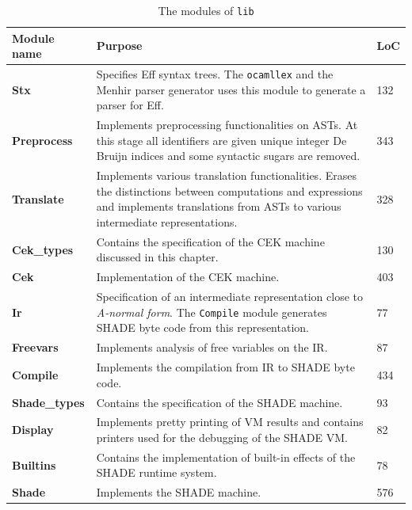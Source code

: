\documentclass[class=article, crop=false]{standalone}
\begin{document}
\begin{table}
    \centering
    {\renewcommand{\arraystretch}{1.3}
    \begin{tabular}{p{3cm}p{10cm}l}
    \toprule
    \textbf{Module name} & \textbf{Purpose} & \textbf{LoC} \\
    \midrule
    \textbf{Stx} & 
        Specifies Eff syntax trees. The \verb|ocamllex| and the Menhir parser
        generator uses this module to generate a parser for Eff. &
        132 \\
    \textbf{Preprocess} &
        Implements preprocessing functionalities on ASTs. At this stage all
        identifiers are given unique integer De Bruijn indices
        and some syntactic sugars are removed.  &
        343 \\
    \textbf{Translate} &
        Implements various translation functionalities. Erases the distinctions
        between computations and expressions and implements translations from
        ASTs to various intermediate representations. &
        328 \\
    \textbf{Cek\_types} & Contains the specification of the CEK machine
        discussed in this chapter. &
        130 \\
    \textbf{Cek} &
        Implementation of the CEK machine. &
        403 \\
    \textbf{Ir} &
        Specification of an intermediate representation close to \emph{A-normal
        form}. The \verb|Compile| module generates SHADE byte code from this
        representation. &
        77 \\
    \textbf{Freevars} &
        Implements analysis of free variables on the IR. &
        87 \\
    \textbf{Compile} &
        Implements the compilation from IR to SHADE byte code. &
        434 \\
    \textbf{Shade\_types} &
        Contains the specification of the SHADE machine. &
        93 \\
    \textbf{Display} &
        Implements pretty printing of VM results and contains printers used for
        the debugging of the SHADE VM. &
        82 \\
    \textbf{Builtins} &
        Contains the implementation of built-in effects of the SHADE runtime
        system. &
        78 \\
    \textbf{Shade} &
        Implements the SHADE machine. &
        576 \\
    \bottomrule
    \end{tabular}}
    \caption[OCaml modules and their purpose]{The modules of \texttt{lib}}
    \label{tab:lib-modules}
\end{table}
\end{document}
